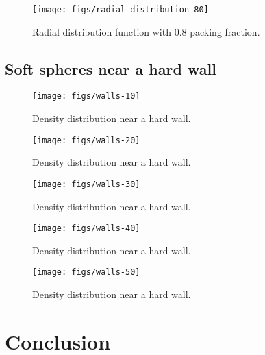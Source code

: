 \documentclass[letterpaper,twocolumn,amsmath,amssymb,prb]{revtex4-1}
\begin{document}
\begin{figure}
\begin{center}
\texttt{[image: figs/radial-distribution-80]}
\end{center}
\caption{Radial distribution function with 0.8 packing
  fraction.}
\label{fig:radial-distribution-80}
\end{figure}

\subsection{Soft spheres near a hard wall}

\begin{figure}
\begin{center}
\texttt{[image: figs/walls-10]}
\end{center}
\caption{Density distribution near a hard wall.}
\label{fig:walls-10}
\end{figure}

\begin{figure}
\begin{center}
\texttt{[image: figs/walls-20]}
\end{center}
\caption{Density distribution near a hard wall.}
\label{fig:walls-20}
\end{figure}

\begin{figure}
\begin{center}
\texttt{[image: figs/walls-30]}
\end{center}
\caption{Density distribution near a hard wall.}
\label{fig:walls-30}
\end{figure}

\begin{figure}
\begin{center}
\texttt{[image: figs/walls-40]}
\end{center}
\caption{Density distribution near a hard wall.}
\label{fig:walls-40}
\end{figure}

\begin{figure}
\begin{center}
\texttt{[image: figs/walls-50]}
\end{center}
\caption{Density distribution near a hard wall.}
\label{fig:walls-50}
\end{figure}


\section{Conclusion}
\end{document}
